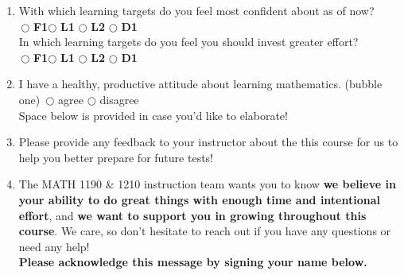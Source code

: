 \documentclass[10pt]{article}
\begin{document}
\begin{enumerate}

    
\newpage

Read the solution to Knowledge Checkpoint 1 to learn how to do the problems on it. Then answer the following questions.
    
\item With which learning targets do you feel most confident about as of now?\\

\,\hfill $\bigcirc$ {\bf\color{ProcessBlue}F1}\hfill $\bigcirc$ {\bf\color{RoyalBlue} L1} \hfill $\bigcirc$ {\bf\color{RoyalBlue} L2} \hfill $\bigcirc$ {\bf\color{ForestGreen} D1}  \hfill\,\\

In which learning targets do you feel you should invest greater effort?\\

\,\hfill $\bigcirc$ {\bf\color{ProcessBlue}F1}\hfill $\bigcirc$ {\bf\color{RoyalBlue} L1} \hfill $\bigcirc$ {\bf\color{RoyalBlue} L2} \hfill $\bigcirc$ {\bf\color{ForestGreen} D1}  \hfill\,\\


\item I have a healthy, productive attitude about learning mathematics. (bubble one) \,\hfill $\bigcirc$ agree \hfill $\bigcirc$ disagree \hfill\,\\[0.1in]
Space below is provided in case you'd like to elaborate! 

\vfill

\item Please provide any feedback to your instructor about the this course for us to help you better prepare for future tests!

\vfill

\item The MATH 1190 \& 1210 instruction team wants you to know {\bf we believe in your ability to do great things with enough time and intentional effort}, and {\bf we want to support you in growing throughout this course}. We care, so don't hesitate to reach out if you have any questions or need any help!\\ 

{\bf Please acknowledge this message by signing your name below.}\\[0.5in]
    
\end{enumerate}
\end{document}

